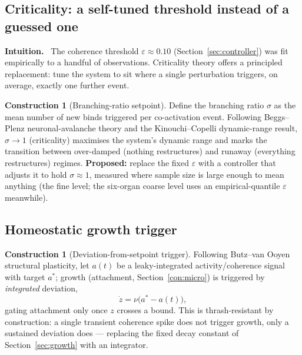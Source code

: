 \documentclass[11pt]{article}
\theoremstyle{definition}
\newtheorem{construction}[definition]{Construction}
\theoremstyle{plain}
\theoremstyle{remark}
\newcommand{\Intu}{\noindent\textbf{\color{intuitioncol}Intuition.}\ }
\begin{document}
\subsection{Criticality: a self-tuned threshold instead of a guessed one}

\begin{intu}\Intu
The coherence threshold $\varepsilon\approx0.10$ (Section~\ref{sec:controller}) was
fit empirically to a handful of observations. Criticality theory offers a
principled replacement: tune the system to sit where a single perturbation triggers,
on average, exactly one further event.
\end{intu}

\begin{construction}[Branching-ratio setpoint]
Define the branching ratio $\sigma$ as the mean number of new binds triggered per
co-activation event. Following Beggs--Plenz neuronal-avalanche theory and the
Kinouchi--Copelli dynamic-range result, $\sigma\to1$ (criticality) maximises the
system's dynamic range and marks the transition between over-damped (nothing
restructures) and runaway (everything restructures) regimes. \textbf{Proposed:}
replace the fixed $\varepsilon$ with a controller that adjusts it to hold
$\sigma\approx1$, measured where sample size is large enough to mean anything (the
fine level; the six-organ coarse level uses an empirical-quantile $\varepsilon$
meanwhile).
\end{construction}

\subsection{Homeostatic growth trigger}

\begin{construction}[Deviation-from-setpoint trigger]
Following Butz--van Ooyen structural plasticity, let $a(t)$ be a leaky-integrated
activity/coherence signal with target $a^\ast$; growth (attachment,
Section~\ref{con:micro}) is triggered by \emph{integrated} deviation,
\begin{equation}
\dot z = \nu\big(a^\ast-a(t)\big),
\end{equation}
gating attachment only once $z$ crosses a bound. This is thrash-resistant by
construction: a single transient coherence spike does not trigger growth, only a
sustained deviation does — replacing the fixed decay constant of
Section~\ref{sec:growth} with an integrator.
\end{construction}
\end{document}
